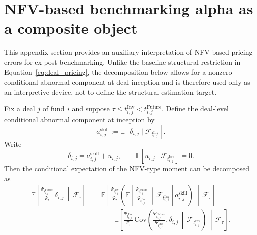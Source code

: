 \section{NFV-based benchmarking alpha as a composite object}
\label{sec:appendix_bv_alpha_interpretation}

This appendix section provides an auxiliary interpretation of NFV-based pricing errors for ex-post benchmarking.
Unlike the baseline structural restriction in Equation~\eqref{eq:deal_pricing}, the decomposition below allows for a nonzero conditional abnormal component at deal inception and is therefore used only as an interpretive device, not to define the structural estimation target.

\begin{remark}
	\label{rem:alpha_decomp}
	Fix a deal $j$ of fund $i$ and suppose $\tau\le t_{i,j}^{\mathrm{Inv}}<t_{i,j}^{\mathrm{Future}}$.
	Define the deal-level conditional abnormal component at inception by
	\[
	a_{i,j}^{\mathrm{skill}}
	:=
	\mathbb{E}\!\left[
	\delta_{i,j}\mid
	\mathcal{F}_{t_{i,j}^{\mathrm{Inv}}}
	\right].
	\]
	Write
	\[
	\delta_{i,j}
	=
	a_{i,j}^{\mathrm{skill}}
	+
	u_{i,j},
	\qquad
	\mathbb{E}\!\left[
	u_{i,j}\mid
	\mathcal{F}_{t_{i,j}^{\mathrm{Inv}}}
	\right]
	=
	0.
	\]
	Then the conditional expectation of the NFV-type moment can be decomposed as
	\begin{align}
		\label{eq:alpha_decomp_general}
		\mathbb{E}\!\left[
		\frac{\Psi_{t_{i,j}^{\mathrm{Future}}}}{\Psi_\tau}\,
		\delta_{i,j}
		\,\middle|\,
		\mathcal{F}_\tau
		\right]
		&=
		\mathbb{E}\!\left[
		\frac{\Psi_{t_{i,j}^{\mathrm{Inv}}}}{\Psi_\tau}
		\left(
		\mathbb{E}\!\left[
		\frac{\Psi_{t_{i,j}^{\mathrm{Future}}}}{\Psi_{t_{i,j}^{\mathrm{Inv}}}}
		\,\middle|\,
		\mathcal{F}_{t_{i,j}^{\mathrm{Inv}}}
		\right]
		a_{i,j}^{\mathrm{skill}}
		\right)
		\,\middle|\,
		\mathcal{F}_\tau
		\right]
		\nonumber\\
		&\qquad
		+
		\mathbb{E}\!\left[
		\frac{\Psi_{t_{i,j}^{\mathrm{Inv}}}}{\Psi_\tau}\,
		\mathrm{Cov}\!\left(
		\frac{\Psi_{t_{i,j}^{\mathrm{Future}}}}{\Psi_{t_{i,j}^{\mathrm{Inv}}}},
		\delta_{i,j}
		\,\middle|\,
		\mathcal{F}_{t_{i,j}^{\mathrm{Inv}}}
		\right)
		\,\middle|\,
		\mathcal{F}_\tau
		\right].
	\end{align}
	

\end{remark}
